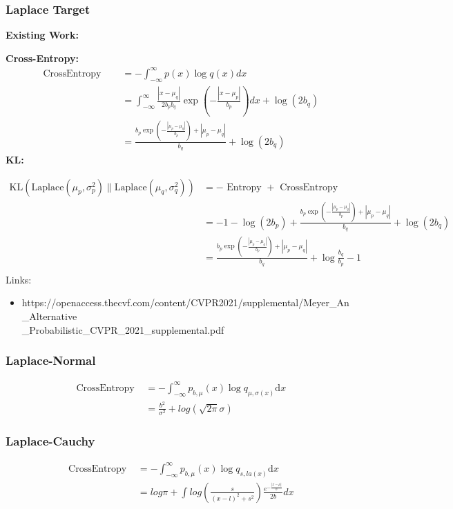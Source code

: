 \documentclass{article}
\begin{document}
\subsubsection{Laplace Target}

\noindent \textbf{Existing Work:}

\noindent \textbf{Cross-Entropy:}
$$ \begin{aligned} \text { CrossEntropy }
\quad &=-\int_{-\infty}^{\infty} p(x) \log q(x) d x \\
\quad &=\int_{-\infty}^{\infty} \frac{\left|x-\mu_{q}\right|}{2 b_{p} b_{q}} \exp \left(-\frac{\left|x-\mu_{p}\right|}{b_{p}}\right) d x+\log \left(2 b_{q}\right)\\&=\frac{b_{p} \exp \left(-\frac{\left|\mu_{p}-\mu_{q}\right|}{b_{p}}\right)+\left|\mu_{p}-\mu_{q}\right|}{b_{q}}+\log \left(2 b_{q}\right)
\end{aligned}
 $$
\noindent \textbf{KL:}

$$ \begin{aligned}\mathrm{KL}\left(\mathrm{Laplace}\left(\mu_{p}, \sigma_{p}^{2}\right) \| \mathrm{Laplace}\left(\mu_{q}, \sigma_{q}^{2}\right)\right)&=-\text { Entropy }+\text{ CrossEntropy }\\&=-1-\log \left(2 b_{p}\right)+\frac{b_{p} \exp \left(-\frac{\left|\mu_{p}-\mu_{q}\right|}{b_{p}}\right)+\left|\mu_{p}-\mu_{q}\right|}{b_{q}}+\log \left(2 b_{q}\right)\\&=\frac{b_{p} \exp \left(-\frac{\left|\mu_{p}-\mu_{q}\right|}{b_{p}}\right)+\left|\mu_{p}-\mu_{q}\right|}{b_{q}}+\log \frac{b_{q}}{b_{p}}-1\\
\end{aligned}
$$
Links:
\begin{itemize}
    \item  https://openaccess.thecvf.com/content/CVPR2021/supplemental/Meyer\_An\_Alternative\\\_Probabilistic\_CVPR\_2021\_supplemental.pdf
\end{itemize}


\subsubsection{Laplace-Normal}
$$ \begin{aligned} \text { CrossEntropy }&=
-\int_{-\infty}^{\infty} p_{b,\mu}(x) \log q_{\mu, \sigma(x)} \mathrm{d} x \\
&=\frac{b^{2}}{\sigma^{2}}+log(\sqrt{2\pi}\sigma) 
\end{aligned}
 $$
\subsubsection{Laplace-Cauchy}
$$ \begin{aligned} \text { CrossEntropy }&=
-\int_{-\infty}^{\infty} p_{b,\mu}(x) \log q_{s, la(x)} \mathrm{d} x \\
&=log\pi+ \int log(\frac{s}{(x-l)^{2}+s^{2}} )\frac{e^{-\frac{\left | x-\mu \right | }{b} } }{2b} dx \\
\end{aligned}
 $$
 
\end{document}
